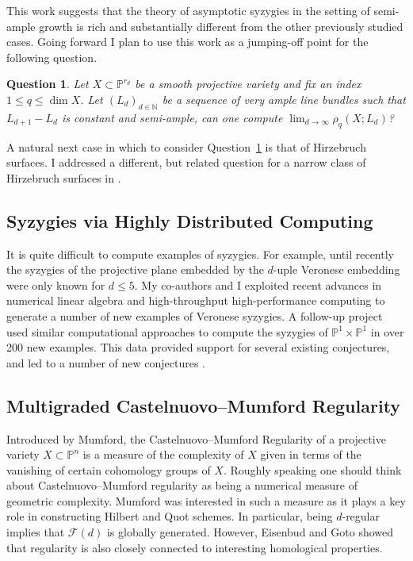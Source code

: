 \documentclass[11pt,reqno]{amsart}
\newtheorem{question}[lemma]{Question}
\theoremstyle{remark}
\newcommand{\cF}{\mathcal{F}}
\newcommand{\N}{\mathbb{N}}
\renewcommand{\P}{\mathbb{P}}
\begin{document}
This work suggests that the theory of asymptotic syzygies in the setting of semi-ample growth is rich and substantially different from the other previously studied cases. Going forward I plan to use this work as a jumping-off point for the following question.  

\begin{question}\label{quest:semi-ample}
Let $X\subset \P^{r_d}$ be a smooth projective variety and fix an index $1\leq q \leq \dim X$. Let $(L_{d})_{d\in\N}$ be a sequence of very ample line bundles such that $L_{d+1}-L_{d}$ is constant and semi-ample, can one compute $\lim_{d\to\infty} \rho_{q}\left(X;L_{d}\right)$?
\end{question}

A natural next case in which to consider Question~\ref{quest:semi-ample} is that of Hirzebruch surfaces. I addressed a different, but related question for a narrow class of Hirzebruch surfaces in \cite{bruce19-hirzebruch}.

\subsection{Syzygies via Highly Distributed Computing}

It is quite difficult to compute examples of syzygies. For example, until recently the syzygies of the projective plane embedded by the $d$-uple Veronese embedding were only known for $d\leq 5$. My co-authors and I exploited recent advances in numerical linear algebra and high-throughput high-performance computing to generate a number of new examples of Veronese syzygies. A follow-up project used similar computational approaches to compute the syzygies of $\P^{1}\times\P^{1}$ in over 200 new examples. This data provided support for several existing conjectures, and led to a number of new conjectures \cite{bruceErmanGoldsteinYang18,bruceErman19,BCEGLY22}.  %


\subsection{Multigraded Castelnuovo–Mumford Regularity}\label{subsec:prior-mgreg}

Introduced by Mumford, the Castelnuovo–Mumford Regularity of a projective variety $X\subset \P^{n}$ is a measure of the complexity of $X$ given in terms of the vanishing of certain cohomology groups of $X$. Roughly speaking one should think about Castelnuovo--Mumford regularity as being a numerical measure of geometric complexity. Mumford was interested in such a measure as it plays a key role in constructing Hilbert and Quot schemes. In particular, being $d$-regular implies that $\cF(d)$ is globally generated. However, Eisenbud and Goto showed that regularity is also closely connected to interesting homological properties.
\end{document}
